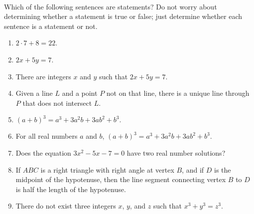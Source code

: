 \begin{prog} \label{prog:statements2} \hfill \\
Which of the following sentences are statements?  Do not worry about determining whether a statement is true or false; just determine whether each sentence is a statement or not.

\begin{multicols}{2}
\begin{enumerate}

\item $2 \cdot 7 + 8 = 22$.


\item $2x + 5y = 7$.\label{PA:prop3}
\end{enumerate}
\end{multicols}
\begin{enumerate} \setcounter{enumi}{2}
\item There are integers  $x$  and  $y$  such that $2x + 5y = 7.$\label{PA:prop4}



\item Given a line  $L$  and a point  $P$  not on that line, there is a unique line through  $P$  that does not intersect  $L$.

\item $\left( {a + b} \right)^3  = a^3 + 3a^2b + 3ab^2  + b^3.$\label{PA:prop8}

\item For all real numbers $a$ and $b$, $\left( {a + b} \right)^3  = a^3  + 3a^2b + 3ab^2 + b^3$.
\label{PA:prop9}


\item Does the equation $3x^2 - 5x - 7 = 0$ have two real number solutions?

\item If $ABC$ is a right triangle with right angle at vertex $B$, and if $D$ is the midpoint of the hypotenuse, then the line segment connecting vertex $B$ to $D$ is half the length of the hypotenuse.


\item There do not exist three integers  $x$, $y$, and  $z$ such that 
 $x^3  + y^3  = z^3.$
\end{enumerate}
\end{prog}
\hbreak

\endinput
